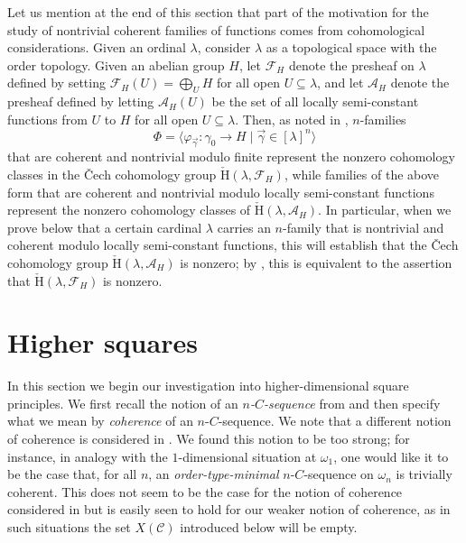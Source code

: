 \documentclass{amsart}
\numberwithin{theorem}{section}
\theoremstyle{definition}
\newcommand{\mc}{\mathcal}
\newcommand{\ra}{\rightarrow}
\begin{document}
Let us mention at the end of this section that part of the motivation for the 
study of nontrivial coherent families of functions comes from cohomological considerations. 
Given an ordinal $\lambda$, consider $\lambda$ as a topological space with the order 
topology. Given an abelian group $H$, let $\mc{F}_H$ denote the presheaf on $\lambda$ 
defined by setting $\mc{F}_H(U) = \bigoplus_U H$ for all open $U \subseteq \lambda$, and 
let $\mc{A}_H$ denote the presheaf defined by letting $\mc{A}_H(U)$ be the set of all 
locally semi-constant functions from $U$ to $H$ for all open $U \subseteq \lambda$. Then, as 
noted in \cite[Theorem 3.2]{bergfalk2024introductionhigherwalks}, $n$-families 
\[
  \Phi = \langle \varphi_{\vec{\gamma}}:\gamma_0 \ra H \mid \vec{\gamma} \in [\lambda]^n \rangle
\]
that are coherent and nontrivial modulo finite represent the nonzero cohomology classes in the 
\v{C}ech cohomology group $\check{\mathrm{H}}(\lambda, \mc{F}_H)$, while families of the above 
form that are coherent and nontrivial modulo locally semi-constant functions represent the nonzero 
cohomology classes of $\check{\mathrm{H}}(\lambda, \mc{A}_H)$. In particular, when we prove below 
that a certain cardinal $\lambda$ carries an $n$-family that is nontrivial and coherent modulo 
locally semi-constant functions, this will establish that the \v{C}ech cohomology group 
$\check{\mathrm{H}}(\lambda, \mc{A}_H)$ is nonzero; by \cite[Theorem 3.2 and 
Lemma 7.4]{bergfalk2024introductionhigherwalks}, this is equivalent to the assertion that 
$\check{\mathrm{H}}(\lambda, \mc{F}_H)$ is nonzero.

\section{Higher squares} \label{section: squares}

In this section we begin our investigation into higher-dimensional square principles. 
We first recall the notion of an \emph{$n$-$C$-sequence} from \cite{bergfalk2024introductionhigherwalks} 
and then specify what we mean by \emph{coherence} of an $n$-$C$-sequence. 
We note that a different notion of coherence is considered in 
\cite[Theorem 7.2(3)]{bergfalk2024introductionhigherwalks}. We found this notion to be too 
strong; for instance, in analogy with the $1$-dimensional situation at $\omega_1$, one would 
like it to be the case that, for all $n$, an \emph{order-type-minimal} $n$-$C$-sequence 
on $\omega_n$ is trivially coherent. This does not seem to be the case for the notion of 
coherence considered in \cite{bergfalk2024introductionhigherwalks} but is easily seen to hold 
for our weaker notion of coherence, as in such situations the set 
$X(\mc{C})$ introduced below will be empty.
\end{document}
